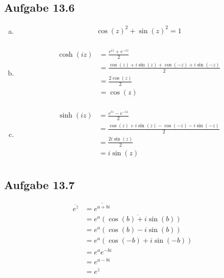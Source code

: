 \documentclass{standalone}
\begin{document}
\subsection{Aufgabe 13.6}
\begin{enumerate}[a)]
\item
    \begin{align*}
        \cos(z)^2+\sin(z)^2 = 1 \\
    \end{align*}

\item
    \begin{align*}
        \cosh(iz) &= \frac{e^{iz}+e^{-iz}}{2} \\
                  &= \frac{\cos(z)+i\sin(z)+\cos(-z)+i\sin(-z)}{2} \\
                  &= \frac{2\cos(z)}{2} \\
                  &= \cos(z) \\
    \end{align*}

\item
    \begin{align*}
        \sinh(iz) &= \frac{e^{iz}-e^{-iz}}{2} \\
                  &= \frac{\cos(z)+i\sin(z)-\cos(-z)-i\sin(-z)}{2} \\
                  &= \frac{2i\sin(z)}{2} \\
                  &= i\sin(z) \\
    \end{align*}

\end{enumerate}

\subsection{Aufgabe 13.7}
    \begin{align*}
        \overline{e^z} &= \overline{e^{a+bi}} \\
                       &= \overline{e^a(\cos(b)+i\sin(b))} \\
                       &= e^a(\cos(b)-i\sin(b)) \\
                       &= e^a(\cos(-b)+i\sin(-b)) \\
                       &= e^a e^{-bi} \\
                       &= e^{a-bi} \\
                       &= e^{\overline{z}} \\
    \end{align*}
\end{document}
